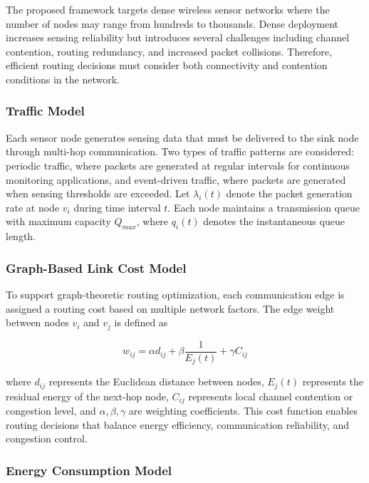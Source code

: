 \documentclass[a4paper,fleqn]{cas-dc}
\numberwithin{equation}{section}
\begin{document}
The proposed framework targets dense wireless sensor networks where the number of nodes may range from hundreds to thousands. Dense deployment increases sensing reliability but introduces several challenges including channel contention, routing redundancy, and increased packet collisions. Therefore, efficient routing decisions must consider both connectivity and contention conditions in the network.

\subsubsection{Traffic Model}

Each sensor node generates sensing data that must be delivered to the sink node through multi-hop communication. Two types of traffic patterns are considered: periodic traffic, where packets are generated at regular intervals for continuous monitoring applications, and event-driven traffic, where packets are generated when sensing thresholds are exceeded. Let $\lambda_i(t)$ denote the packet generation rate at node $v_i$ during time interval $t$. Each node maintains a transmission queue with maximum capacity $Q_{max}$, where $q_i(t)$ denotes the instantaneous queue length.

\subsubsection{Graph-Based Link Cost Model}

To support graph-theoretic routing optimization, each communication edge is assigned a routing cost based on multiple network factors. The edge weight between nodes $v_i$ and $v_j$ is defined as

\begin{equation}
w_{ij} = \alpha d_{ij} + \beta \frac{1}{E_j(t)} + \gamma C_{ij}
\end{equation}

where $d_{ij}$ represents the Euclidean distance between nodes, $E_j(t)$ represents the residual energy of the next-hop node, $C_{ij}$ represents local channel contention or congestion level, and $\alpha, \beta, \gamma$ are weighting coefficients. This cost function enables routing decisions that balance energy efficiency, communication reliability, and congestion control.

\subsubsection{Energy Consumption Model}
\end{document}
